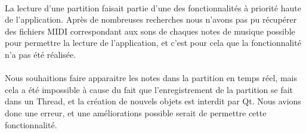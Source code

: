 \paragraph{}
La lecture d'une partition faisait partie d'une des fonctionnalités à priorité haute de l'application. Après 
de nombreuses recherches nous n'avons pas pu récupérer des fichiers MIDI correspondant aux sons de chaques 
notes de musique possible pour permettre la lecture de l'application, et c'est pour cela que la fonctionnalité 
n'a pas été réalisée.

\paragraph{}
Nous souhaitions faire apparaitre les notes dans la partition en temps réel, mais cela a été impossible à cause 
du fait que l'enregistrement de la partition se fait dans un Thread, et la création de nouvels objets est 
interdit par Qt. Nous avions donc une erreur, et une améliorations possible serait de permettre cette fonctionnalité.
